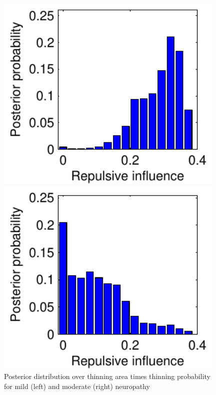 \documentclass{statsoc}
\begin{document}
  \begin{figure}
  \centering
  \begin{minipage}[h]{0.22\linewidth}
    \centering \vspace{-.1in}
  \caption{Posterior distribution over thinning area times thinning probability for mild (left) and moderate (right) neuropathy}
  \label{fig:rep_inf}
  \end{minipage}
  \begin{minipage}[h]{0.3\linewidth}
  \centering
  \includegraphics[width=0.98\textwidth]{figs/plot_mild_repuls.pdf}
  \end{minipage}
  \begin{minipage}[h]{0.3\linewidth}
  \centering
  \includegraphics[width=0.98\textwidth]{figs/plot_mod_repuls.pdf}
  \end{minipage}
  \end{figure}
\end{document}
